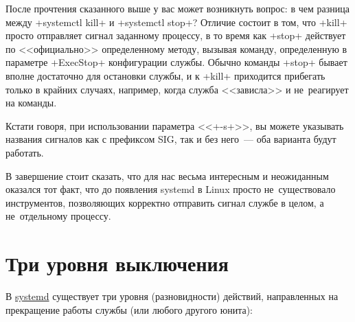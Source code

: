 \documentclass[10pt,oneside,a4paper]{article}
\begin{document}
После прочтения сказанного выше у вас может возникнуть вопрос: в чем разница
между +systemctl kill+ и +systemctl stop+? Отличие состоит в том,
что +kill+ просто отправляет сигнал заданному процессу, в то время как
+stop+ действует по <<официально>> определенному методу, вызывая команду,
определенную в параметре +ExecStop+ конфигурации службы. Обычно команды
+stop+ бывает вполне достаточно для остановки службы, и к +kill+
приходится прибегать только в крайних случаях, например, когда служба
<<зависла>> и не~реагирует на команды.

Кстати говоря, при использовании параметра <<+-s+>>, вы можете указывать
названия сигналов как с префиксом SIG, так и без него~--- оба варианта будут
работать.

В завершение стоит сказать, что для нас весьма интересным и неожиданным
оказался тот факт, что до появления systemd в Linux просто не~существовало
инструментов, позволяющих корректно отправить сигнал службе в целом, а
не~отдельному процессу.

\section{Три уровня выключения}
\label{sec:off}

В \href{http://www.freedesktop.org/wiki/Software/systemd}{systemd} существует
три уровня (разновидности) действий, направленных на прекращение работы службы
(или любого другого юнита):
\end{document}
